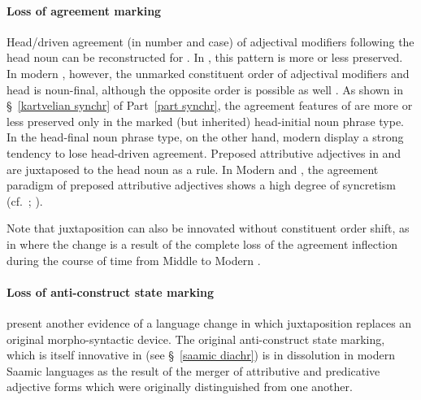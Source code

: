 {\paragraph{Loss of agreement marking}
Head\slash{}driven agreement (in number and case) of adjectival modifiers following the head noun can be reconstructed for . In , this pattern is more or less preserved. In modern , however, the unmarked constituent order of adjectival modifiers and head is noun-final, although the opposite order is possible as well \citep[56]{harris1991a}.  As shown in \S~\ref{kartvelian synchr} of Part~\ref{part synchr}, the agreement features of  are more or less preserved only in the marked (but inherited) head-initial noun phrase type. In the head-final noun phrase type, on the other hand, modern  display a strong tendency to lose head\hyp{}driven agreement. Preposed attributive adjectives in  and  are juxtaposed to the head noun as a rule. In Modern  and , the agreement paradigm of preposed attributive adjectives shows a high degree of syncretism (cf.~\citealt[56]{harris1991a}; \citealt[56–60, elsewhere]{tuite1998}).

Note that juxtaposition can also be innovated without constituent order shift, as in  where the change is a result of the complete loss of the agreement inflection during the course of time from Middle to Modern . 

\paragraph{Loss of anti-construct state marking}
 present another evidence of a language change in which juxtaposition replaces an original morpho-syntactic device. The original anti-construct state marking, which is itself innovative in  (see \S~\ref{saamic diachr}) is in dissolution in modern Saamic languages as the result of the merger of attributive and predicative adjective forms which were originally distinguished from one another.


}
